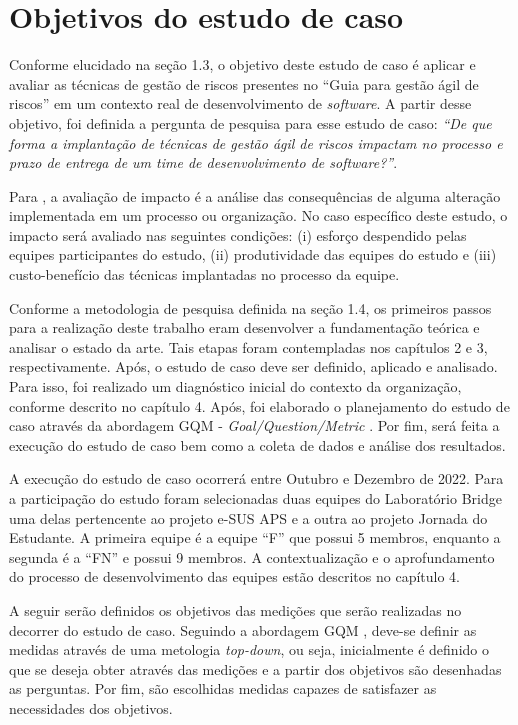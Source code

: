 \documentclass[
    12pt,       %
    openright,      %
    twoside,      %
    a4paper,      %
    english,      %
    french,       %
    spanish,      %
    brazil,       %
    ]{abntex2}
\begin{document}
\section{Objetivos do estudo de caso}

Conforme elucidado na seção 1.3, o objetivo deste estudo de caso é aplicar e avaliar as técnicas de gestão de riscos presentes no “Guia para gestão ágil de riscos” \cite{Vieira:2020} em um contexto real de desenvolvimento de \textit{software}. A partir desse objetivo, foi definida a pergunta de pesquisa para esse estudo de caso: \textit{``De que forma a implantação de técnicas de gestão ágil de riscos impactam no processo e prazo de entrega de um time de desenvolvimento de software?''}. 

Para , a avaliação de impacto é a análise das consequências de alguma alteração implementada em um processo ou organização. No caso específico deste estudo, o impacto será avaliado nas seguintes condições: (i) esforço despendido pelas equipes participantes do estudo, (ii) produtividade das equipes do estudo e (iii) custo-benefício das técnicas implantadas no processo da equipe. 

Conforme a metodologia de pesquisa definida na seção 1.4, os primeiros passos para a realização deste trabalho eram desenvolver a fundamentação teórica e analisar o estado da arte. Tais etapas foram contempladas nos capítulos 2 e 3, respectivamente. Após, o estudo de caso deve ser definido, aplicado e analisado. Para isso, foi realizado um diagnóstico inicial do contexto da organização, conforme descrito no capítulo 4. Após, foi elaborado o planejamento do estudo de caso através da abordagem GQM - \textit{Goal/Question/Metric} \cite{KOZIOLEK:2005}. Por fim, será feita a execução do estudo de caso bem como a coleta de dados e análise dos resultados.

A execução do estudo de caso ocorrerá entre Outubro e Dezembro de 2022. Para a participação do estudo foram selecionadas duas equipes do Laboratório Bridge uma delas pertencente ao projeto e-SUS APS e a outra ao projeto Jornada do Estudante. A primeira equipe é a equipe ``F'' que possui 5 membros, enquanto a segunda é a ``FN'' e possui 9 membros. A contextualização e o aprofundamento do processo de desenvolvimento das equipes estão descritos no capítulo 4.

A seguir serão definidos os objetivos das medições que serão realizadas no decorrer do estudo de caso. Seguindo a abordagem GQM \cite{KOZIOLEK:2005}, deve-se definir as medidas através de uma metologia \textit{top-down}, ou seja, inicialmente é definido o que se deseja obter através das medições e a partir dos objetivos são desenhadas as perguntas. Por fim, são escolhidas medidas capazes de satisfazer as necessidades dos objetivos.
\end{document}
